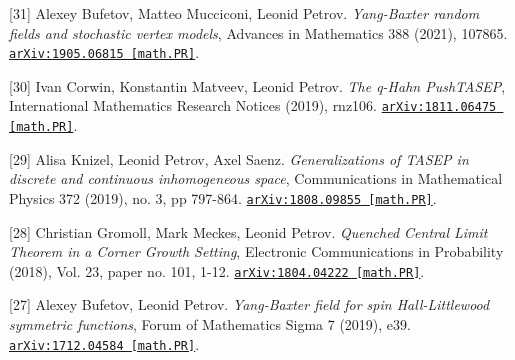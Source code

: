\begin{etaremune}
\item[{[31]}] 
Alexey Bufetov, Matteo Mucciconi, Leonid Petrov.
\emph{Yang-Baxter random fields and stochastic vertex models}, Advances in Mathematics 388 (2021), 107865. 
\href{https://arxiv.org/abs/1905.06815}{\texttt{arXiv:1905.06815 [math.PR]}}.













\item[{[30]}] 
Ivan Corwin, Konstantin Matveev, Leonid Petrov.
\emph{The q-Hahn PushTASEP}, International Mathematics Research Notices (2019),  rnz106. 
\href{https://arxiv.org/abs/1811.06475}{\texttt{arXiv:1811.06475 [math.PR]}}.





\item[{[29]}] 
Alisa Knizel, Leonid Petrov, Axel Saenz.
\emph{Generalizations of TASEP in discrete and continuous inhomogeneous space}, Communications in Mathematical Physics 372 (2019), no. 3, pp 797-864. 
\href{https://arxiv.org/abs/1808.09855}{\texttt{arXiv:1808.09855 [math.PR]}}.











\item[{[28]}] 
Christian Gromoll, Mark Meckes, Leonid Petrov.
\emph{Quenched Central Limit Theorem in a Corner Growth Setting}, Electronic Communications in Probability (2018), Vol. 23, paper no. 101, 1-12. 
\href{https://arxiv.org/abs/1804.04222}{\texttt{arXiv:1804.04222 [math.PR]}}.













\item[{[27]}] 
Alexey Bufetov, Leonid Petrov.
\emph{Yang-Baxter field for spin Hall-Littlewood symmetric functions}, Forum of Mathematics Sigma 7 (2019), e39. 
\href{https://arxiv.org/abs/1712.04584}{\texttt{arXiv:1712.04584 [math.PR]}}.














\end{etaremune}
